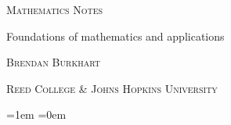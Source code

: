 \documentclass[oneside,openany]{memoir}
\begin{document}
\begin{titlingpage}
    \centering
    \vspace*{1cm}
    {\scshape\Huge Mathematics Notes \par}
    \vspace{1cm}
    {\LARGE Foundations of mathematics and applications \par}
    \vfill
    \vfill
    \begin{tikzpicture}
        
    \end{tikzpicture}
    \vfill
    \vfill
    \vfill
    {\scshape\large Brendan Burkhart \par}
    \vspace{0.5cm}
    {\scshape Reed College \& Johns Hopkins University \par}
    \vspace{0.5cm}
    {\scshape \number\year \par}
    \vfill
\end{titlingpage}

\tableofcontents

\parskip=1em
\parindent=0em



















\end{document}
